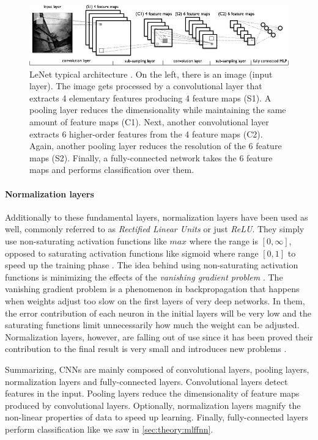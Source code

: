 \begin{figure}[t]
  \begin{center}
    \includegraphics[width=\textwidth]{gfx/conv-network}
  \end{center}
  \caption{
    LeNet typical architecture \cite{Lisa2010}.
    On the left, there is an image (input layer).
    The image gets processed by a convolutional layer that extracts 4 elementary features producing 4 feature maps (S1).
    A pooling layer reduces the dimensionality while maintaining the same amount of feature maps (C1).
    Next, another convolutional layer extracts 6 higher-order features from the 4 feature maps (C2).
    Again, another pooling layer reduces the resolution of the 6 feature maps (S2).
    Finally, a fully-connected network takes the 6 feature maps and performs classification over them.
  }
  \label{fig:sec:theory:convnet}
\end{figure}

\paragraph{Normalization layers}
Additionally to these fundamental layers, normalization layers have been used as well, commonly referred to as \emph{Rectified Linear Units} or just \emph{ReLU}.
They simply use non-saturating activation functions like $max$ where the range is $[0,\infty]$, opposed to saturating activation functions like sigmoid where range $[0,1]$ to speed up the training phase \cite{Krizhevsky2012,Nair2010}.
The idea behind using non-saturating activation functions is minimizing the effects of the \emph{vanishing gradient problem} \cite{Socher2015}.
The vanishing gradient problem is a phenomenon in backpropagation that happens when weights adjust too slow on the first layers of very deep networks.
In them, the error contribution of each neuron in the initial layers will be very low and the saturating functions limit unnecessarily how much the weight can be adjusted.
Normalization layers, however, are falling out of use since it has been proved their contribution to the final result is very small and introduces new problems \cite{Lo2015}.

Summarizing, CNNs are mainly composed of convolutional layers, pooling layers, normalization layers and fully-connected layers.
Convolutional layers detect features in the input.
Pooling layers reduce the dimensionality of feature maps produced by convolutional layers.
Optionally, normalization layers magnify the non-linear properties of data to speed up learning.
Finally, fully-connected layers perform classification like we saw in \autoref{sec:theory:mlffnn}.


